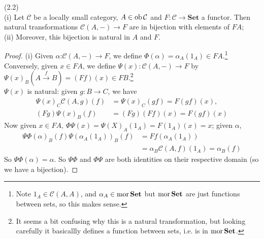 \documentclass[a4paper]{article}
\begin{document}
\begin{lemma} (2.2)\\
    (i) Let $\mathcal{C}$ be a locally small category, $A \in \operatorname{ob} \mathcal{C}$ and $F:\mathcal{C} \to \mathbf{Set}$ a functor. Then natural transformations $\mathcal{C}(A,-) \to F$ are in bijection with elements of $FA$;\\
    (ii) Moreover, this bijection is natural in $A$ and $F$.
    \begin{proof}
        (i) Given $\alpha$:$\mathcal{C}(A,-) \to F$, we define $\Phi(\alpha) = \alpha_A(1_A) \in FA$.\footnote{Note $1_A \in \mathcal{C}(A,A)$, and $\alpha_A \in \operatorname{mor} \mathbf{Set}$ but $\operatorname{mor} \mathbf{Set}$ are just functions between sets, so this makes sense.}\\
        Conversely, given $x \in FA$, we define $\Psi(x): \mathcal{C}(A,-) \to F$ by $\Psi(x)_B (A \xrightarrow{f} B) = (Ff)(x) \in FB$.\footnote{It seems a bit confusing why this is a natural transformation, but looking carefully it basicallly defines a function between sets, i.e. is in $\operatorname{mor} \mathbf{Set}$.}\\
        $\Psi(x)$ is natural: given $g:B \to C$, we have
        \begin{equation*}
            \begin{aligned}
                \Psi(x)_C \mathcal{C}(A,g) (f) &= \Psi(x)_C (gf) = F(gf)(x),\\
                (Fg) \Psi(x)_B(f) &= (Fg)(Ff)(x) = F(gf)(x)
            \end{aligned}
        \end{equation*}
        Now given $x \in FA$, $\Phi\Psi(x) = \Psi(X)_A (1_A) = F(1_A)(x) = x$; given $\alpha$,
        \begin{equation*}
            \begin{aligned}
                \Psi\Phi(\alpha)_B(f) \Psi(\alpha_A(1_A))_B(f) &= Ff(\alpha_A(1_A))\\
                &= \alpha_B\mathcal{C}(A,f)(1_A) = \alpha_B(f)
            \end{aligned}
        \end{equation*}
        So $\Psi\Phi(\alpha)=\alpha$. So $\Psi\Phi$ and $\Phi\Psi$ are both identities on their respective domain (so we have a bijection).
    \end{proof}
\end{lemma}
\end{document}

